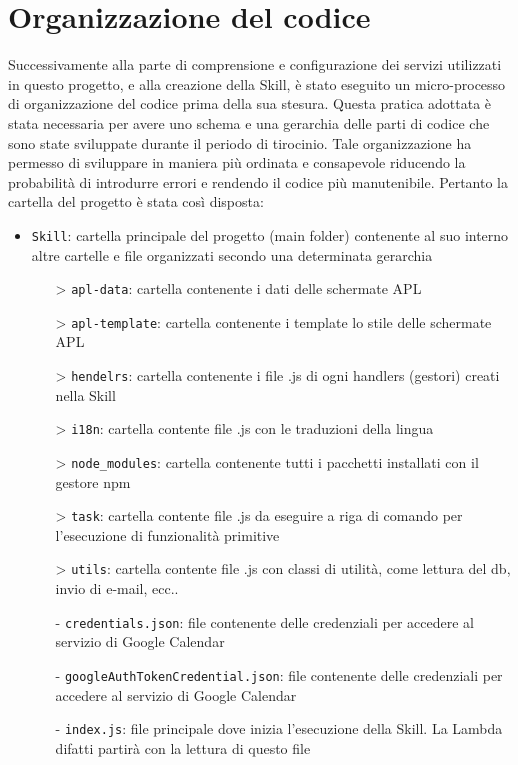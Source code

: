 \section{Organizzazione del codice}
Successivamente alla parte di comprensione e configurazione dei servizi utilizzati in questo progetto, e alla creazione della Skill, è stato eseguito un micro-processo di organizzazione del codice prima della sua stesura. Questa pratica adottata è stata necessaria per avere uno schema e una gerarchia delle parti di codice che sono state sviluppate durante il periodo di tirocinio. Tale organizzazione ha permesso di sviluppare in maniera più ordinata e consapevole riducendo la probabilità di introdurre errori e rendendo il codice più manutenibile. Pertanto la cartella del progetto è stata così disposta:
\begin{itemize}
        \item \texttt{Skill}: cartella principale del progetto (main folder) contenente al suo interno altre cartelle e file organizzati secondo una determinata gerarchia
        \begin{itemize}
            \item[>] \texttt{apl-data}: cartella contenente i dati delle schermate APL
            \item[>] \texttt{apl-template}: cartella contenente i template lo stile delle schermate APL
            \item[>] \texttt{hendelrs}: cartella contenente i file .js di ogni handlers (gestori) creati nella Skill
            \item[>] \texttt{i18n}: cartella contente file .js con le traduzioni della lingua 
            \item[>] \texttt{node\_modules}: cartella contenente tutti i pacchetti installati con il gestore npm
            \item[>] \texttt{task}: cartella contente file .js da eseguire a riga di comando per l'esecuzione di funzionalità primitive 
            \item[>] \texttt{utils}: cartella contente file .js con classi di utilità, come lettura del db, invio di e-mail, ecc..
            \item[-] \texttt{credentials.json}: file contenente delle credenziali per accedere al servizio di Google Calendar
            \item[-] \texttt{googleAuthTokenCredential.json}: file contenente delle credenziali per accedere al servizio di Google Calendar
            \item[-] \texttt{index.js}: file principale dove inizia l'esecuzione della Skill. La Lambda difatti partirà con la lettura di questo file

\end{itemize}
\end{itemize}
